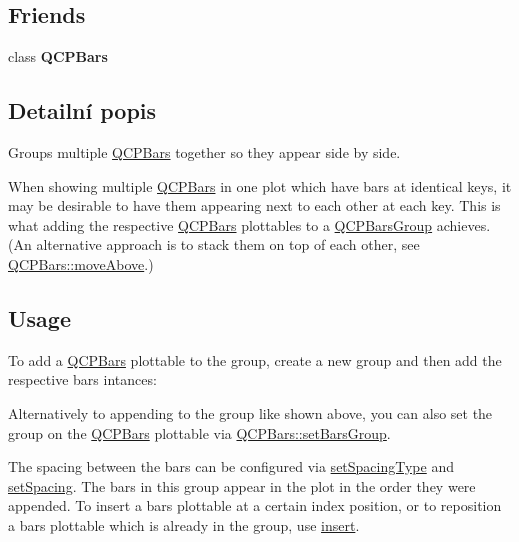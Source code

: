 \subsection*{Friends}
\begin{DoxyCompactItemize}
\item 
\hypertarget{classQCPBarsGroup_a721b87c7cdb8e83a90d77fc8a22e7195}{}class {\bfseries Q\+C\+P\+Bars}\label{classQCPBarsGroup_a721b87c7cdb8e83a90d77fc8a22e7195}

\end{DoxyCompactItemize}


\subsection{Detailní popis}
Groups multiple \hyperlink{classQCPBars}{Q\+C\+P\+Bars} together so they appear side by side. 



When showing multiple \hyperlink{classQCPBars}{Q\+C\+P\+Bars} in one plot which have bars at identical keys, it may be desirable to have them appearing next to each other at each key. This is what adding the respective \hyperlink{classQCPBars}{Q\+C\+P\+Bars} plottables to a \hyperlink{classQCPBarsGroup}{Q\+C\+P\+Bars\+Group} achieves. (An alternative approach is to stack them on top of each other, see \hyperlink{classQCPBars_ac22e00a6a41509538c21b04f0a57318c}{Q\+C\+P\+Bars\+::move\+Above}.)\hypertarget{classQCPBarsGroup_qcpbarsgroup-usage}{}\subsection{Usage}\label{classQCPBarsGroup_qcpbarsgroup-usage}
To add a \hyperlink{classQCPBars}{Q\+C\+P\+Bars} plottable to the group, create a new group and then add the respective bars intances\+: 
\begin{DoxyCodeInclude}
\end{DoxyCodeInclude}
Alternatively to appending to the group like shown above, you can also set the group on the \hyperlink{classQCPBars}{Q\+C\+P\+Bars} plottable via \hyperlink{classQCPBars_aedd1709061f0b307c47ddb45e172ef9a}{Q\+C\+P\+Bars\+::set\+Bars\+Group}.

The spacing between the bars can be configured via \hyperlink{classQCPBarsGroup_a2c7e2d61b10594a4555b615e1fcaf49e}{set\+Spacing\+Type} and \hyperlink{classQCPBarsGroup_aa553d327479d72a0c3dafcc724a190e2}{set\+Spacing}. The bars in this group appear in the plot in the order they were appended. To insert a bars plottable at a certain index position, or to reposition a bars plottable which is already in the group, use \hyperlink{classQCPBarsGroup_a309a5f7233db189f3ea9c2d04ece6c13}{insert}.

